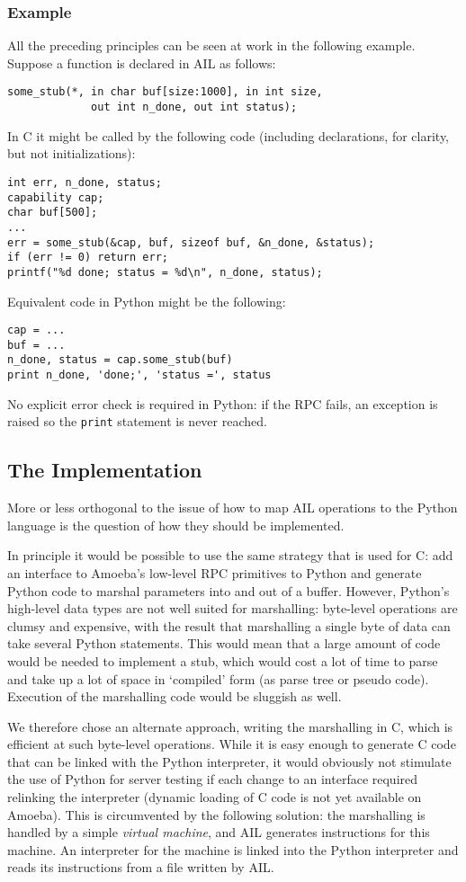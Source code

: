 \subsubsection{Example}

All the preceding principles can be seen at work in the following
example.  Suppose a function is declared in AIL as follows:
\begin{verbatim}
some_stub(*, in char buf[size:1000], in int size,
             out int n_done, out int status);
\end{verbatim}
In C it might be called by the following code (including declarations,
for clarity, but not initializations):
\begin{verbatim}
int err, n_done, status;
capability cap;
char buf[500];
...
err = some_stub(&cap, buf, sizeof buf, &n_done, &status);
if (err != 0) return err;
printf("%d done; status = %d\n", n_done, status);
\end{verbatim}
Equivalent code in Python might be the following:
\begin{verbatim}
cap = ...
buf = ...
n_done, status = cap.some_stub(buf)
print n_done, 'done;', 'status =', status
\end{verbatim}
No explicit error check is required in Python: if the RPC fails, an
exception is raised so the {\tt print} statement is never reached.

\subsection{The Implementation}

More or less orthogonal to the issue of how to map AIL operations to
the Python language is the question of how they should be implemented.

In principle it would be possible to use the same strategy that is
used for C: add an interface to Amoeba's low-level RPC primitives to
Python and generate Python code to marshal parameters into and out of
a buffer.  However, Python's high-level data types are not well suited
for marshalling: byte-level operations are clumsy and expensive, with
the result that marshalling a single byte of data can take several
Python statements.  This would mean that a large amount of code would
be needed to implement a stub, which would cost a lot of time to parse
and take up a lot of space in `compiled' form (as parse tree or pseudo
code).  Execution of the marshalling code would be sluggish as well.

We therefore chose an alternate approach, writing the marshalling in
C, which is efficient at such byte-level operations.  While it is easy
enough to generate C code that can be linked with the Python
interpreter, it would obviously not stimulate the use of Python for
server testing if each change to an interface required relinking the
interpreter (dynamic loading of C code is not yet available on
Amoeba).  This is circumvented by the following solution: the
marshalling is handled by a simple {\em virtual machine}, and AIL
generates instructions for this machine.  An interpreter for the
machine is linked into the Python interpreter and reads its
instructions from a file written by AIL.

